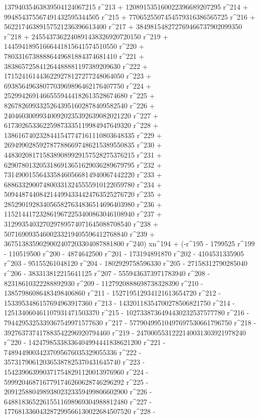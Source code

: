        13794035463839504124067215 r^213 + 
       120891535160022396689207295 r^214 + 
       994854375567491432595344505 r^215 + 
       7706525507454579316386565725 r^216 + 
       56221746389157521236396613400 r^217 + 
       384981548272769466737902099350 r^218 + 
       2455437362240891438326920720150 r^219 + 
       14459418951666441815641574510550 r^220 + 
       78033167388886449681884374681410 r^221 + 
       383865725841264488881197389209630 r^222 + 
       1715241614436229278127277248064050 r^223 + 
       6938564963807703969896462176407750 r^224 + 
       25299426914665559444182613528674680 r^225 + 
       82678269933252643951602878409582540 r^226 + 
       240460300993400920235392639082021220 r^227 + 
       617302653362259873335119984947649320 r^228 + 
       1386167402328441547747161110803648335 r^229 + 
       2694990285927877886697486215389550835 r^230 + 
       4483020817158389089929157528275376215 r^231 + 
       6290780132053186913651629036289679795 r^232 + 
       7314900155643358460566814940067442220 r^233 + 
       6886332900748003313245555910122059780 r^234 + 
       5094487440842144994334424763525276720 r^235 + 
       2852901928340565827634836514696403980 r^236 + 
       1152144172328619672253400863046108940 r^237 + 
       312993540327029789574071645088708540 r^238 + 
       50716909354600233219405596412768840 r^239 + 
       3675138359029002407203304087881800 r^240) xn^194 + (-r^195 - 
       1799525 r^199 - 110519500 r^200 - 4874642500 r^201 - 
       173194891870 r^202 - 4104531335905 r^203 - 
       95155261048120 r^204 - 1802929758596330 r^205 - 
       27158312790285040 r^206 - 383313812215641125 r^207 - 
       5559436373971783940 r^208 - 82318610322288892930 r^209 - 
       1127920888698738328390 r^210 - 13857986086483498406860 r^211 - 
       152719512934121613654720 r^212 - 
       1533953486157694963917360 r^213 - 
       14320118354700278506821750 r^214 - 
       125134060461107931471503370 r^215 - 
       1027338736494430232537577780 r^216 - 
       7944295325339367549971577630 r^217 - 
       57790499510497697530661796750 r^218 - 
       392763737417883542296920794460 r^219 - 
       2470005531222140031303921978240 r^220 - 
       14247985338336404994441838621200 r^221 - 
       74894490034237095676035329055336 r^222 - 
       357317906120365387825370431645740 r^223 - 
       1542390639903717548291120013976960 r^224 - 
       5999204687167791746260628746296292 r^225 - 
       20912588049893802323359499806602900 r^226 - 
       64881836522615511698969304988812480 r^227 - 
       177681336043287299566130022684507520 r^228 - 
